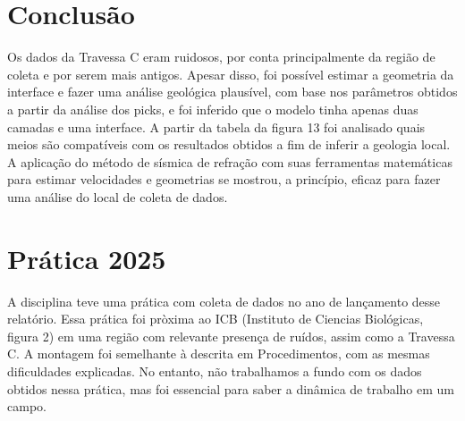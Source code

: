 \documentclass[a4paper,12pt]{article}
\begin{document}
\section{Conclusão}

Os dados da Travessa C eram ruidosos, por conta principalmente da região de coleta e por serem mais antigos. Apesar disso, foi possível estimar a geometria da interface e fazer uma análise geológica plausível, com base nos parâmetros obtidos a partir da análise dos picks, e foi inferido que o modelo tinha apenas duas camadas e uma interface. A partir da tabela da figura 13 foi analisado quais meios são compatíveis com os resultados obtidos a fim de inferir a geologia local. A aplicação do método de sísmica de refração com suas ferramentas matemáticas para estimar velocidades e geometrias se mostrou, a princípio, eficaz para fazer uma análise do local de coleta de dados. 


\section{Prática 2025}

A disciplina teve uma prática com coleta de dados no ano de lançamento desse relatório. Essa prática foi pròxima ao ICB (Instituto de Ciencias Biológicas, figura 2) em uma região com relevante presença de ruídos, assim como a Travessa C. A montagem foi semelhante à descrita em Procedimentos, com as mesmas dificuldades explicadas. No entanto, não trabalhamos a fundo com os dados obtidos nessa prática, mas foi essencial para saber a dinâmica de trabalho em um campo. 
\end{document}
